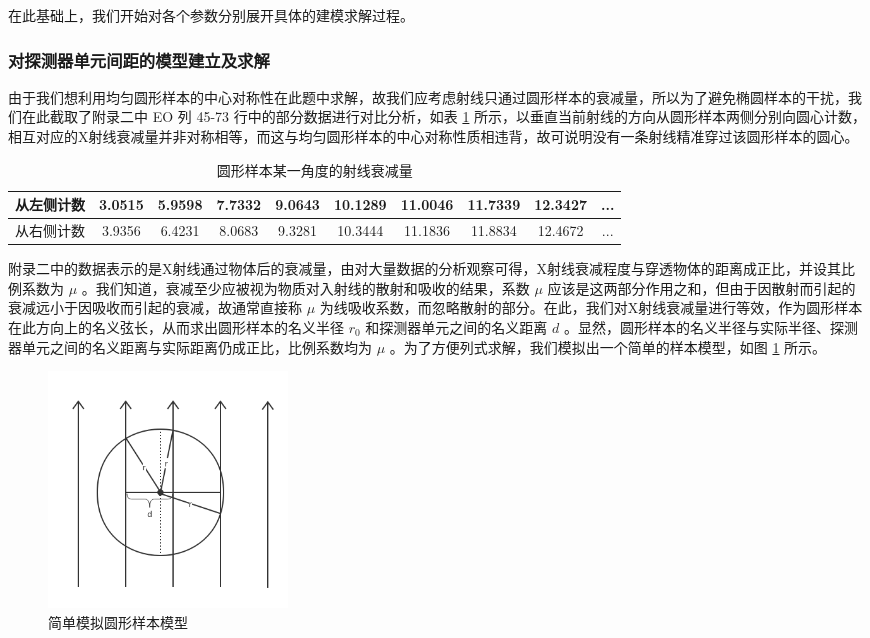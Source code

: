 \documentclass[UTF8]{ctexart}
\begin{document}
在此基础上，我们开始对各个参数分别展开具体的建模求解过程。

\subsubsection{对探测器单元间距的模型建立及求解}

由于我们想利用均匀圆形样本的中心对称性在此题中求解，故我们应考虑射线只通过圆形样本的衰减量，所以为了避免椭圆样本的干扰，我们在此截取了附录二中 EO 列 45-73 行中的部分数据进行对比分析，如表 \ref{danyuan} 所示，以垂直当前射线的方向从圆形样本两侧分别向圆心计数，相互对应的X射线衰减量并非对称相等，而这与均匀圆形样本的中心对称性质相违背，故可说明没有一条射线精准穿过该圆形样本的圆心。

\begin{table}[htbp]
\centering
\caption{圆形样本某一角度的射线衰减量}
\label{danyuan}
\begin{tabular}{c|ccccccccc}
\hline
从左侧计数 & 3.0515 & 5.9598 & 7.7332 & 9.0643 & 10.1289 & 11.0046 & 11.7339 & 12.3427 & ... \\
\hline
从右侧计数 & 3.9356 & 6.4231 & 8.0683 & 9.3281 & 10.3444 & 11.1836 & 11.8834 & 12.4672 & ... \\
\hline
\end{tabular}
\end{table}

附录二中的数据表示的是X射线通过物体后的衰减量，由对大量数据的分析观察可得，X射线衰减程度与穿透物体的距离成正比，并设其比例系数为 $\mu$ 。我们知道，衰减至少应被视为物质对入射线的散射和吸收的结果，系数 $\mu$ 应该是这两部分作用之和，但由于因散射而引起的衰减远小于因吸收而引起的衰减，故通常直接称 $\mu$ 为线吸收系数，而忽略散射的部分。在此，我们对X射线衰减量进行等效，作为圆形样本在此方向上的名义弦长，从而求出圆形样本的名义半径 $r_0$ 和探测器单元之间的名义距离 $d$ 。显然，圆形样本的名义半径与实际半径、探测器单元之间的名义距离与实际距离仍成正比，比例系数均为 $\mu$ 。为了方便列式求解，我们模拟出一个简单的样本模型，如图 \ref{fig:circle} 所示。

\begin{figure}[htbp]
  \centering
  \includegraphics[width=2.5in]{../figure/circle.png}
  \caption{简单模拟圆形样本模型}
  \label{fig:circle}
\end{figure}
\end{document}
